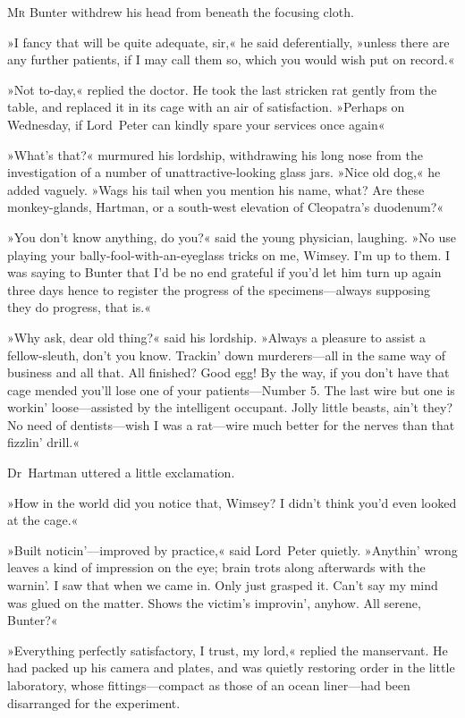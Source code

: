 
\lettrine[lines=4]{M}{r} Bunter withdrew his head from beneath the focusing cloth.

\zz
»I fancy that will be quite adequate, sir,« he said deferentially, »unless there are any further patients, if I may call them so, which you would wish put on record.«

»Not to-day,« replied the doctor. He took the last stricken rat gently from the table, and replaced it in its cage with an air of satisfaction. »Perhaps on Wednesday, if Lord~Peter can kindly spare your services once again\longdash«

»What's that?« murmured his lordship, withdrawing his long nose from the investigation of a number of unattractive-looking glass jars. »Nice old dog,« he added vaguely. »Wags his tail when you mention his name, what? Are these monkey-glands, Hartman, or a south-west elevation of Cleopatra's duodenum?«

»You don't know anything, do you?« said the young physician, laughing. »No use playing your bally-fool-with-an-eyeglass tricks on me, Wimsey. I'm up to them. I was saying to Bunter that I'd be no end grateful if you'd let him turn up again three days hence to register the progress of the specimens—always supposing they do progress, that is.«

»Why ask, dear old thing?« said his lordship. »Always a pleasure to assist a fellow-sleuth, don't you know. Trackin' down murderers—all in the same way of business and all that. All finished? Good egg! By the way, if you don't have that cage mended you'll lose one of your patients—Number 5. The last wire but one is workin' loose—assisted by the intelligent occupant. Jolly little beasts, ain't they? No need of dentists—wish I was a rat—wire much better for the nerves than that fizzlin' drill.«

Dr~Hartman uttered a little exclamation.

»How in the world did you notice that, Wimsey? I didn't think you'd even looked at the cage.«

»Built noticin'—improved by practice,« said Lord~Peter quietly. »Anythin' wrong leaves a kind of impression on the eye; brain trots along afterwards with the warnin'. I saw that when we came in. Only just grasped it. Can't say my mind was glued on the matter. Shows the victim's improvin', anyhow. All serene, Bunter?«

»Everything perfectly satisfactory, I trust, my lord,« replied the manservant. He had packed up his camera and plates, and was quietly restoring order in the little laboratory, whose fittings—compact as those of an ocean liner—had been disarranged for the experiment.

